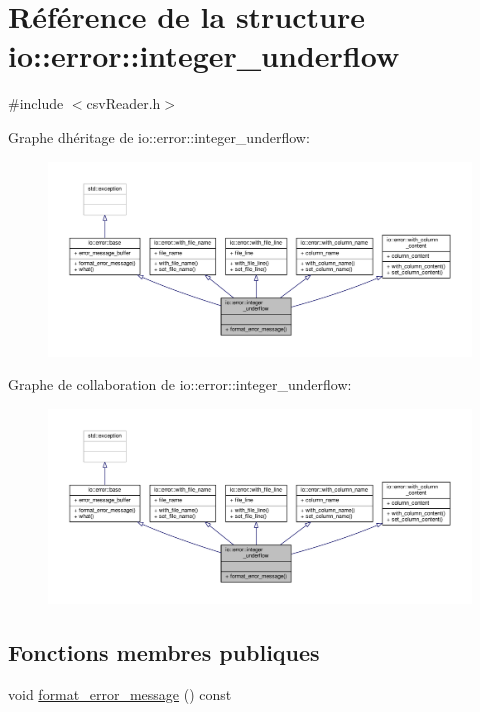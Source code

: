 \hypertarget{structio_1_1error_1_1integer__underflow}{}\section{Référence de la structure io\+:\+:error\+:\+:integer\+\_\+underflow}
\label{structio_1_1error_1_1integer__underflow}


{\ttfamily \#include $<$csv\+Reader.\+h$>$}



Graphe d\textquotesingle{}héritage de io\+:\+:error\+:\+:integer\+\_\+underflow\+:
\nopagebreak
\begin{figure}[H]
\begin{center}
\leavevmode
\includegraphics[width=350pt]{structio_1_1error_1_1integer__underflow__inherit__graph}
\end{center}
\end{figure}


Graphe de collaboration de io\+:\+:error\+:\+:integer\+\_\+underflow\+:
\nopagebreak
\begin{figure}[H]
\begin{center}
\leavevmode
\includegraphics[width=350pt]{structio_1_1error_1_1integer__underflow__coll__graph}
\end{center}
\end{figure}
\subsection*{Fonctions membres publiques}
\begin{DoxyCompactItemize}
\item 
void \hyperlink{structio_1_1error_1_1integer__underflow_a2ded9c7e982403877055514543207847}{format\+\_\+error\+\_\+message} () const
\end{DoxyCompactItemize}
